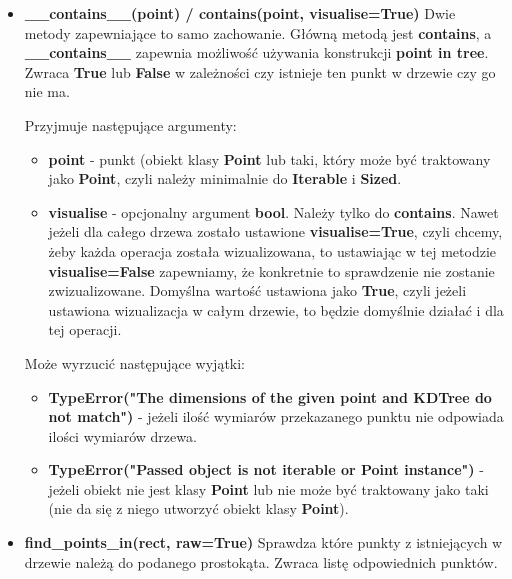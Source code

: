 \documentclass[a4paper, 12pt]{article}
\begin{document}
\begin{itemize}
        \item \textbf{\_\_contains\_\_(point) / contains(point, visualise=True)} \vspace{6pt}\newline
        \quad Dwie metody zapewniające to samo zachowanie. Główną metodą jest \textbf{contains}, a \textbf{\_\_contains\_\_} zapewnia możliwość używania konstrukcji \textbf{point in tree}. Zwraca \textbf{True} lub \textbf{False} w zależności czy istnieje ten punkt w drzewie czy go nie ma.
        
        \noindent
        \quad Przyjmuje następujące argumenty:
        \begin{itemize}
            \item \textbf{point} - punkt (obiekt klasy \textbf{Point} lub taki, który może być traktowany jako \textbf{Point}, czyli należy minimalnie do \textbf{Iterable} i \textbf{Sized}.
            \item \textbf{visualise} - opcjonalny argument \textbf{bool}. Należy tylko do \textbf{contains}. Nawet jeżeli dla całego drzewa zostało ustawione \textbf{visualise=True}, czyli chcemy, żeby każda operacja została wizualizowana, to ustawiając w tej metodzie \textbf{visualise=False} zapewniamy, że konkretnie to sprawdzenie nie zostanie zwizualizowane. Domyślna wartość ustawiona jako \textbf{True}, czyli jeżeli ustawiona wizualizacja w całym drzewie, to będzie domyślnie działać i dla tej operacji.
        \end{itemize}
        
        \noindent
        \quad Może wyrzucić następujące wyjątki:
        \begin{itemize}
            \item \textbf{TypeError("The dimensions of the given point and KDTree do not match")} - jeżeli ilość wymiarów przekazanego punktu nie odpowiada ilości wymiarów drzewa.
            \item \textbf{TypeError("Passed object is not iterable or Point instance")} - jeżeli obiekt nie jest klasy \textbf{Point} lub nie może być traktowany jako taki (nie da się z niego utworzyć obiekt klasy \textbf{Point}).
        \end{itemize}
        \vspace{6pt}
        
        \item \textbf{find\_points\_in(rect, raw=True)} \vspace{6pt}\newline
        \quad Sprawdza które punkty z istniejących w drzewie należą do podanego prostokąta. Zwraca listę odpowiednich punktów.
        

\end{itemize}
\end{document}
